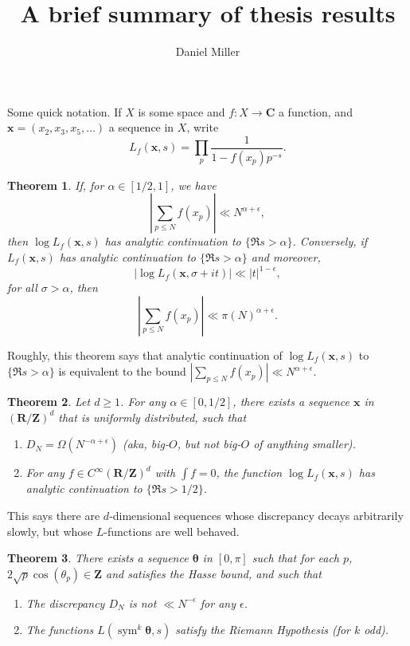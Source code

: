 \documentclass{article}
\title{A brief summary of thesis results}
\author{Daniel Miller}
\DeclareMathOperator{\sym}{sym}
\newcommand{\bC}{\mathbf{C}}
\newcommand{\bR}{\mathbf{R}}
\newcommand{\btheta}{{\boldsymbol \theta}}
\newcommand{\bx}{{\boldsymbol x}}
\newcommand{\bZ}{\mathbf{Z}}
\newtheorem{theorem}{Theorem}
\begin{document}
\maketitle





Some quick notation. If $X$ is some space and $f\colon X\to \bC$ a function, 
and $\bx=(x_2,x_3,x_5,\dots)$ a sequence in $X$, write 
\[
	L_f(\bx,s) = \prod_p \frac{1}{1-f(x_p) p^{-s}} .
\]

\begin{theorem}
If, for $\alpha\in [1/2,1]$, we have 
\[
	\left| \sum_{p\leqslant N} f(x_p)\right| \ll N^{\alpha+\epsilon} ,
\]
then $\log L_f(\bx,s)$ has analytic continuation to $\{\Re s>\alpha\}$. 
Conversely, if $L_f(\bx,s)$ has analytic continuation to $\{\Re s>\alpha\}$ and 
moreover, 
\[
	|\log L_f(\bx,\sigma+i t)| \ll |t|^{1-\epsilon},
\]
for all $\sigma>\alpha$, then 
\[
	\left|\sum_{p\leqslant N} f(x_p)\right| \ll \pi(N)^{\alpha+\epsilon} .
\]
\end{theorem}

Roughly, this theorem says that analytic continuation of $\log L_f(\bx,s)$ to 
$\{\Re s>\alpha\}$ is equivalent to the bound 
$|\sum_{p\leqslant N} f(x_p)| \ll N^{\alpha+\epsilon}$. 

\begin{theorem}
Let $d\geqslant 1$. For any $\alpha\in [0,1/2]$, there exists a sequence 
$\bx$ in $(\bR/\bZ)^d$ that is uniformly distributed, such that 
\begin{enumerate}
\item
$D_N = \Omega(N^{-\alpha+\epsilon})$ (aka, big-$O$, but not big-$O$ of anything 
smaller).
\item
For any $f\in C^\infty(\bR/\bZ)^d$ with $\int f=0$, the function 
$\log L_f(\bx,s)$ has analytic continuation to $\{\Re s > 1/2\}$. 
\end{enumerate}
\end{theorem}

This says there are $d$-dimensional sequences whose discrepancy decays 
arbitrarily slowly, but whose $L$-functions are well behaved. 

\begin{theorem}
There exists a sequence $\btheta$ in $[0,\pi]$ such that for each $p$, 
$2\sqrt p \cos(\theta_p)\in \bZ$ and satisfies the Hasse bound, and such that 
\begin{enumerate}
\item
The discrepancy $D_N$ is not $\ll N^{-\epsilon}$ for any $\epsilon$. 
\item
The functions $L(\sym^k\btheta, s)$ satisfy the Riemann Hypothesis (for 
$k$ odd). 
\end{enumerate}
\end{theorem}
\end{document}
